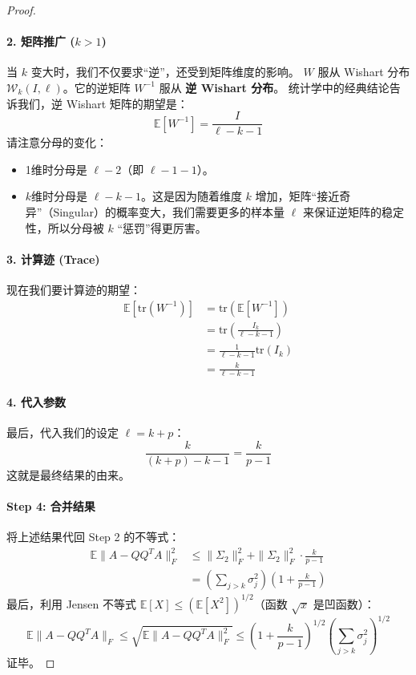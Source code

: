 \documentclass[11pt,a4paper]{ctexart}
\theoremstyle{definition}
\theoremstyle{remark}
\begin{document}
\begin{proof}
\paragraph{2. 矩阵推广 ($k>1$)}
当 $k$ 变大时，我们不仅要求“逆”，还受到矩阵维度的影响。
$W$ 服从 Wishart 分布 $\mathcal{W}_k(I, \ell)$。它的逆矩阵 $W^{-1}$ 服从 \textbf{逆 Wishart 分布}。
统计学中的经典结论告诉我们，逆 Wishart 矩阵的期望是：
\[
\mathbb{E}[W^{-1}] = \frac{I}{\ell - k - 1}
\]
请注意分母的变化：
\begin{itemize}
    \item 1维时分母是 $\ell - 2$（即 $\ell - 1 - 1$）。
    \item $k$维时分母是 $\ell - k - 1$。这是因为随着维度 $k$ 增加，矩阵“接近奇异”（Singular）的概率变大，我们需要更多的样本量 $\ell$ 来保证逆矩阵的稳定性，所以分母被 $k$ “惩罚”得更厉害。
\end{itemize}

\paragraph{3. 计算迹 (Trace)}
现在我们要计算迹的期望：
\[
\begin{aligned}
\mathbb{E}[\text{tr}(W^{-1})] &= \text{tr}(\mathbb{E}[W^{-1}]) \\
&= \text{tr}\left( \frac{I_k}{\ell - k - 1} \right) \\
&= \frac{1}{\ell - k - 1} \text{tr}(I_k) \\
&= \frac{k}{\ell - k - 1}
\end{aligned}
\]

\paragraph{4. 代入参数}
最后，代入我们的设定 $\ell = k + p$：
\[
\frac{k}{(k+p) - k - 1} = \frac{k}{p-1}
\]
这就是最终结果的由来。


\paragraph{Step 4: 合并结果}
将上述结果代回 Step 2 的不等式：
\[
\begin{aligned}
\mathbb{E} \| A - Q Q^T A \|_F^2 &\leq \| \Sigma_2 \|_F^2 + \| \Sigma_2 \|_F^2 \cdot \frac{k}{p-1} \\
&= \left( \sum_{j > k} \sigma_j^2 \right) \left( 1 + \frac{k}{p-1} \right)
\end{aligned}
\]
最后，利用 Jensen 不等式 $\mathbb{E}[X] \leq (\mathbb{E}[X^2])^{1/2}$（函数 $\sqrt{x}$ 是凹函数）：
\[
\mathbb{E} \| A - Q Q^T A \|_F \leq \sqrt{\mathbb{E} \| A - Q Q^T A \|_F^2} \leq \left( 1 + \frac{k}{p-1} \right)^{1/2} \left( \sum_{j > k} \sigma_j^2 \right)^{1/2}
\]
证毕。
\end{proof}
\end{document}
